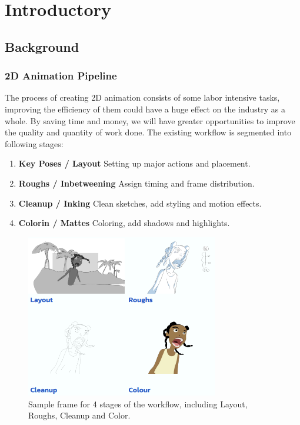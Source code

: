 \chapter{Introductory}
\label{chapterlabel1}
\section{Background}

\subsection{2D Animation Pipeline}

The process of creating 2D animation consists of some labor intensive tasks, improving the efficiency of them could have a huge effect on the industry as a whole. By saving time and money, we will have greater opportunities to improve the quality and quantity of work done. 
The existing workflow is segmented into following stages:

\begin{enumerate}
    \item \textbf{Key Poses / Layout} Setting up major actions and placement.
    \item \textbf{Roughs / Inbetweening} Assign timing and frame distribution.
    \item \textbf{Cleanup / Inking} Clean sketches, add styling and motion effects.
    \item \textbf{Colorin / Mattes} Coloring, add shadows and highlights.
\end{enumerate}

\begin{figure}
    \centering
    \includegraphics[width=0.75\textwidth]{images/introduction/stages.png}
    \caption{Sample frame for 4 stages of the workflow, including Layout, Roughs, Cleanup and Color.} 
    \label{fig:stages}
\end{figure}

